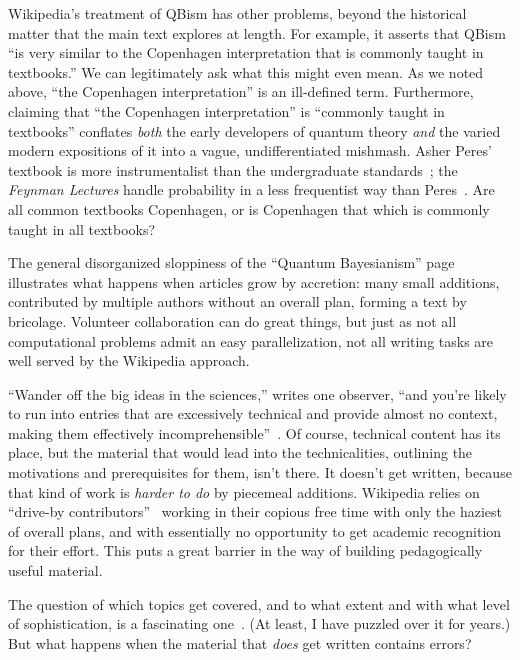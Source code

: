 \documentclass[aps,pra,superscriptaddress,12pt,tightenlines,nofootinbib]{revtex4-2}
\begin{document}
Wikipedia's treatment of QBism has other problems, beyond the
historical matter that the main text explores at length.  For example,
it asserts that QBism ``is very similar to the Copenhagen
interpretation that is commonly taught in textbooks.''  We can
legitimately ask what this might even mean.  As we noted above, ``the
Copenhagen interpretation'' is an ill-defined term.  Furthermore,
claiming that ``the Copenhagen interpretation'' is ``commonly taught
in textbooks'' conflates \emph{both} the early developers of quantum
theory \emph{and} the varied modern expositions of it into a vague,
undifferentiated mishmash.  Asher Peres' textbook is more
instrumentalist than the undergraduate standards~\cite{Peres-book};
the \emph{Feynman Lectures} handle probability in a less frequentist
way than Peres~\cite{FeynmanLP}.  Are all common textbooks Copenhagen, or is
Copenhagen that which is commonly taught in all textbooks?

The general disorganized sloppiness of the ``Quantum Bayesianism''
page illustrates what happens when articles grow by accretion: many
small additions, contributed by multiple authors without an overall
plan, forming a text by bricolage.  Volunteer collaboration can do
great things, but just as not all computational problems admit an easy
parallelization, not all writing tasks are well served by the
Wikipedia approach.

``Wander off the big ideas in the sciences,'' writes one observer,
``and you're likely to run into entries that are excessively technical
and provide almost no context, making them effectively
incomprehensible''~\cite{Timmer2015}.  Of course, technical content
has its place, but the material that would lead into the
technicalities, outlining the motivations and prerequisites for them,
isn't there.  It doesn't get written, because that kind of work is
\emph{harder to do} by piecemeal additions.  Wikipedia relies on
``drive-by contributors''~\cite{Shulman2016} working in their copious
free time with only the haziest of overall plans, and with essentially
no opportunity to get academic recognition for their effort.  This
puts a great barrier in the way of building pedagogically useful
material.

The question of which topics get covered, and to what extent and with
what level of sophistication, is a fascinating one~\cite{Giaimo2016}.
(At least, I have puzzled over it for years.)  But what happens when
the material that \emph{does} get written contains errors?
\end{document}
